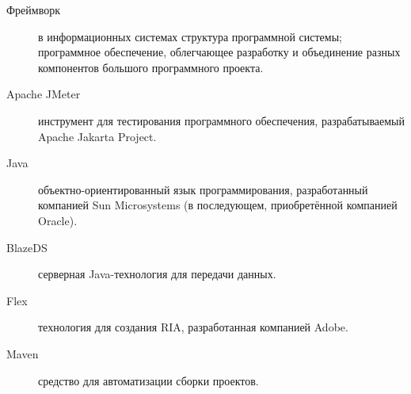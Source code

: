 \Defines
\begin{description}
\item[Фреймворк] в информационных системах структура программной системы; программное обеспечение, облегчающее
разработку и объединение разных компонентов большого программного проекта.
\item[Apache JMeter] инструмент для тестирования программного обеспечения, разрабатываемый Apache Jakarta Project.
\item[Java] объектно-ориентированный язык программирования, разработанный компанией Sun Microsystems
(в последующем, приобретённой компанией Oracle).
\item[BlazeDS] серверная Java-технология для передачи данных.
\item[Flex] технология для создания RIA, разработанная компанией Adobe.
\item[Maven] средство для автоматизации сборки проектов.
\end{description}
